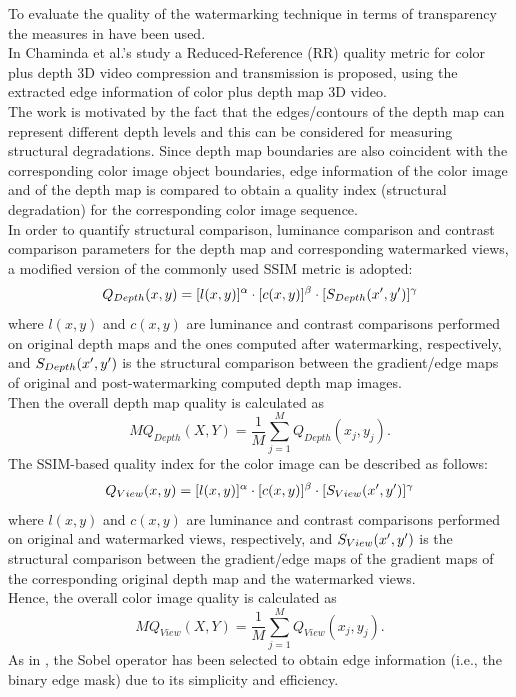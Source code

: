 To evaluate the quality of the watermarking technique in terms of transparency the measures in \cite{QMETRICS} have been used.\\
In Chaminda et al.'s study a Reduced-Reference
(RR) quality metric for color plus depth 3D video compression and transmission is proposed, using the extracted edge information of color plus depth map 3D video.\\ 
The work is motivated by the fact that the edges/contours of the depth map can represent different depth levels and this can be considered for measuring structural degradations. Since depth map boundaries are also coincident with the corresponding color image object boundaries, edge information of the color image and of the depth map is compared to obtain a quality index (structural degradation) for the corresponding color image sequence.\\
In order to quantify structural comparison, luminance comparison and contrast comparison parameters for the depth map and corresponding watermarked views, a modified version of the
commonly used SSIM metric is adopted:
\begin{equation}
Q_{Depth}(x,y) = [l(x,y)]^{\alpha} \cdot [c(x,y)]^{\beta} \cdot [\mathnormal{S}_{Depth}(x',y')]^{\gamma}
\end{equation}
where $l(x,y)$ and $c(x,y)$ are luminance and contrast comparisons performed on original depth maps and the ones computed after watermarking,
respectively, and $\mathnormal{S}_{Depth}(x',y')$  is the structural comparison between the gradient/edge maps of original and post-watermarking computed depth map images.\\
Then the overall depth map quality is calculated as
\begin{equation}
MQ_{Depth}(X,Y) = \frac{1}{M} \sum_{j=1}^{M}Q_{Depth}(x_{j},y_{j}).
\end{equation}
The SSIM-based quality index for the color image can be described as follows:
\begin{equation}
Q_{View}(x,y) = [l(x,y)]^{\alpha} \cdot [c(x,y)]^{\beta} \cdot [\mathnormal{S}_{View}(x',y')]^{\gamma}
\end{equation}
where $l(x,y)$ and $c(x,y)$ are luminance and contrast comparisons performed on original and watermarked views, respectively, and $\mathnormal{S}_{View}(x',y')$  is the structural comparison between the gradient/edge maps of the gradient maps of the corresponding original depth map and the watermarked views.\\
Hence, the overall color image quality is calculated as
\begin{equation}
MQ_{View}(X,Y) = \frac{1}{M} \sum_{j=1}^{M}Q_{View}(x_{j},y_{j}).
\end{equation}
As in \cite{QMETRICS}, the Sobel
operator has been selected to obtain edge information (i.e., the binary edge mask) due to its simplicity and efficiency.\\

